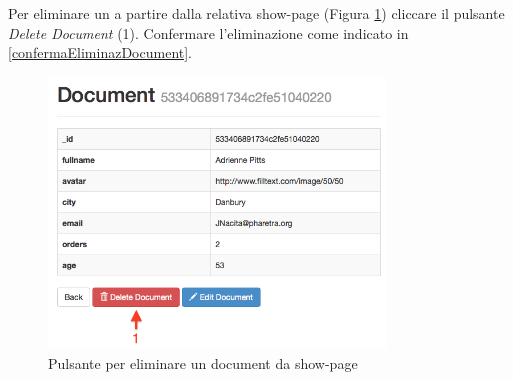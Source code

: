 			Per eliminare un  a partire dalla relativa show-page (Figura \ref{fig:eliminazionedocumentdashowpage}) cliccare il pulsante \emph{Delete Document} (1). Confermare l'eliminazione come indicato in \ref{confermaEliminazDocument}.

				\begin{figure}[H]
					\centering \includegraphics[width=0.8\textwidth]{img/eliminazionedocumentdashowpage.png}
				\caption{\label{fig:eliminazionedocumentdashowpage} Pulsante per eliminare un document da show-page}
				\end{figure}

